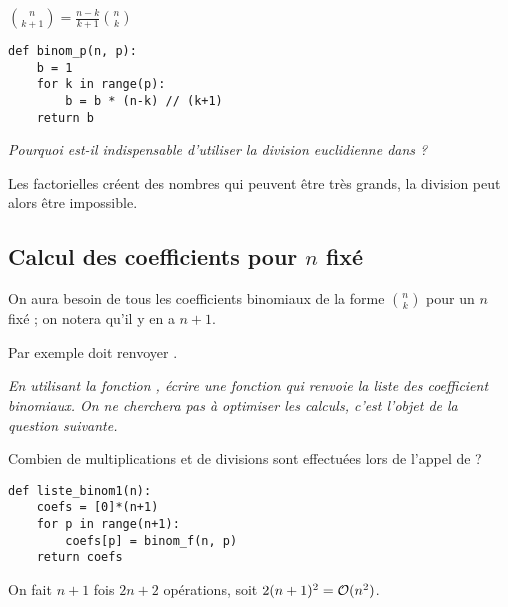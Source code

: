 \begin{Answer}
$\displaystyle  \binom n{k+1} = \frac{n-k}{k+1} \binom nk$
\begin{lstlisting}
def binom_p(n, p):
    b = 1
    for k in range(p):
        b = b * (n-k) // (k+1)
    return b
\end{lstlisting}
\end{Answer}
\begin{Exercise}
\it Pourquoi est-il indispensable d'utiliser la division euclidienne dans  ?
\end{Exercise}
\begin{Answer}
Les factorielles créent des nombres qui peuvent être très grands, la division peut alors être impossible. 
\end{Answer}
\newpage
\subsection{Calcul des coefficients pour $n$ fixé} 
On aura besoin de tous les coefficients binomiaux de la forme $\binom n k$ pour un $n$ fixé ; on notera qu'il y en a $n+1$.

Par exemple  doit renvoyer \type{[1, 8, 28, 56, 70, 56, 28, 8, 1]}.
\begin{Exercise}
\it En utilisant la fonction , écrire une fonction  qui renvoie la liste des coefficient binomiaux. On ne cherchera pas à optimiser les calculs, c'est l'objet de la question suivante.

Combien de multiplications et de divisions sont effectuées lors de l'appel de  ?
\end{Exercise}
\begin{Answer}
\begin{lstlisting}
def liste_binom1(n):
    coefs = [0]*(n+1)
    for p in range(n+1):
        coefs[p] = binom_f(n, p)
    return coefs
\end{lstlisting}

On fait $n+1$ fois $2n+2$ opérations, soit $2(n+1)^2 = {\cal O}(n^2)$.
\end{Answer}
\medskip

